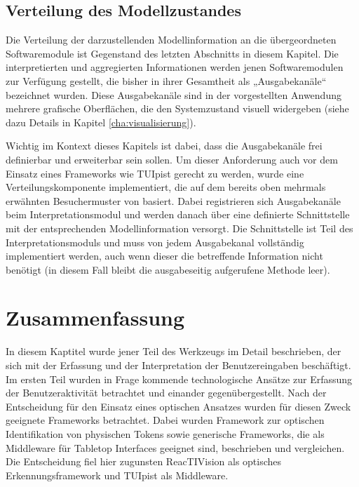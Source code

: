 
\subsection{Verteilung des Modellzustandes} %
\label{sub:verteilung_des_modellzustandes}

Die Verteilung der darzustellenden Modellinformation an die übergeordneten Softwaremodule ist Gegenstand des letzten Abschnitts in diesem Kapitel. Die interpretierten und aggregierten Informationen werden jenen Softwaremodulen zur Verfügung gestellt, die bisher in ihrer Gesamtheit als „Ausgabekanäle“ bezeichnet wurden. Diese Ausgabekanäle sind in der vorgestellten Anwendung mehrere grafische Oberflächen, die den Systemzustand visuell widergeben (siehe dazu Details in Kapitel \ref{cha:visualisierung}). 

Wichtig im Kontext dieses Kapitels ist dabei, dass die Ausgabekanäle frei definierbar und erweiterbar sein sollen. Um dieser Anforderung auch vor dem Einsatz eines Frameworks wie TUIpist gerecht zu werden, wurde eine Verteilungskomponente implementiert, die auf dem bereits oben mehrmals erwähnten Besuchermuster von \citet{Gamma95} basiert. Dabei registrieren sich Ausgabekanäle beim Interpretationsmodul und werden danach über eine definierte Schnittstelle mit der entsprechenden Modellinformation versorgt. Die Schnittstelle ist Teil des Interpretationsmoduls und muss von jedem Ausgabekanal vollständig implementiert werden, auch wenn dieser die betreffende Information nicht benötigt (in diesem Fall bleibt die ausgabeseitig aufgerufene Methode leer). 


\section{Zusammenfassung} %
\label{sec:input_zusammenfassung}

In diesem Kaptitel wurde jener Teil des Werkzeugs im Detail beschrieben, der sich mit der Erfassung und der Interpretation der Benutzereingaben beschäftigt. Im ersten Teil wurden in Frage kommende technologische Ansätze zur Erfassung der Benutzeraktivität betrachtet und einander gegenübergestellt. Nach der Entscheidung für den Einsatz eines optischen Ansatzes wurden für diesen Zweck geeignete Frameworks betrachtet. Dabei wurden Framework zur optischen Identifikation von physischen Tokens sowie generische Frameworks, die als Middleware für Tabletop Interfaces geeignet sind, beschrieben und vergleichen. Die Entscheidung fiel hier zugunsten ReacTIVision \citep{Kaltenbrunner07} als optisches Erkennungsframework und TUIpist \citep{Furtmuller07a} als Middleware.

